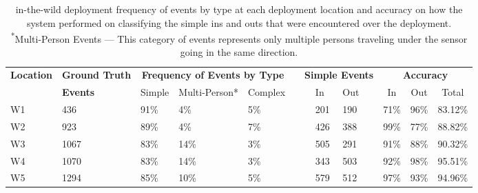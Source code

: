 \begin{table}[t]
\centering
	\footnotesize
		\begin{tabular}{@{}p{0.9in}p{0.8in}lllp{0.12in}p{0.2in}llp{0.2in}ccc@{}}
		\toprule
		\multirow{2}{*}{\textbf{Location}} & \textbf{Ground Truth} & \multicolumn{3}{c}{\textbf{Frequency of Events by Type}} & &\multicolumn{4}{c}{\textbf{Simple Events}} & \multicolumn{3}{c}{\textbf{Accuracy}} \\
	 & \textbf{Events} & Simple & Multi-Person*   & Complex   & &  & In  & Out  &  & In        & Out      & Total        \\  
	\midrule
	W1   & 436   & 91\%   & 4\%    & 5\%  & & & 201   & 190  &  & 71\%   & 96\%    & 83.12\%                   \\ %
	W2   & 923   & 89\%   & 4\%    & 7\%  & & & 426   & 388  &  & 99\%   & 77\%    & 88.82\%                   \\ %
	W3   & 1067  & 83\%   & 14\%   & 3\%  & & & 505   & 291  &  & 91\%   & 88\%    & 90.32\%                   \\ %
	W4   & 1070  & 83\%   & 14\%   & 3\%  & & & 343   & 503  &  & 92\%   & 98\%    & 95.51\%                   \\ %
	W5   & 1294  & 85\%   & 10\%   & 5\%  & & & 579   & 512  &  & 97\%   & 93\%    & 94.96\%                   \\ %
		\bottomrule
		\end{tabular}
		\caption{\sysname in-the-wild deployment frequency of events by type at each deployment location and accuracy on how the system performed on classifying the simple ins and outs that were encountered over the deployment.
		\vspace{1mm}
		\\\textsuperscript{*}Multi-Person Events --- This category of events represents only multiple persons traveling under the sensor going in the same direction.
		\label{tab:ITWresults}}
	
	\end{table}
	


